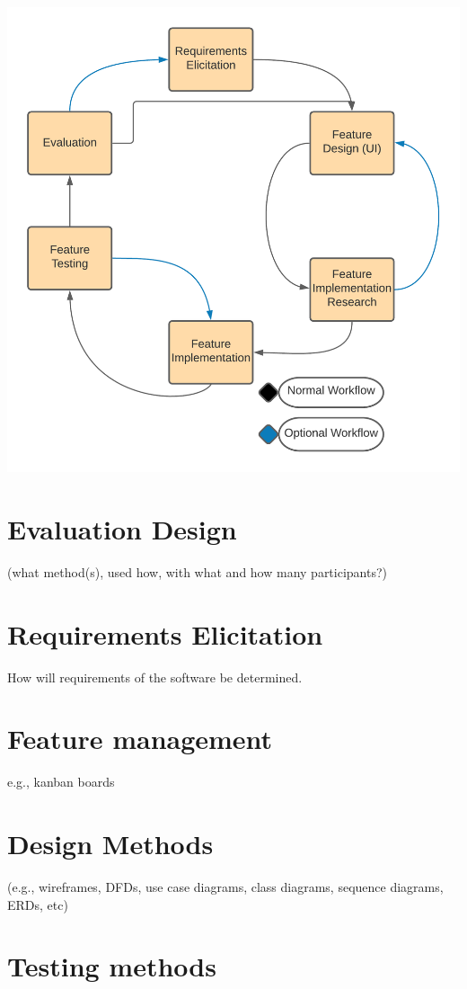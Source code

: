 \includegraphics{Images/Project_Management_Methodology}
\section{Evaluation Design}
 (what method(s), used how, with what and how many participants?)

\section{Requirements Elicitation}
  How will requirements of the software be determined.

\section{Feature management}
  e.g., kanban boards

\section{Design Methods}
   (e.g., wireframes, DFDs, use case diagrams, class diagrams, sequence diagrams, ERDs, etc)

\section{Testing methods}

